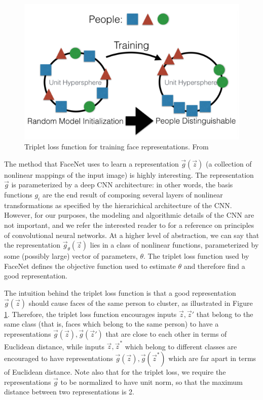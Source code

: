 \begin{figure}
\centering
\includegraphics[scale = 0.5]{Figures/triplet_loss.png}
\caption{Triplet loss function for training face representations.  From \cite{amos2016openface}}
\label{fig:triplet_loss}
\end{figure}

The method that FaceNet uses to learn a representation
$\vec{g}(\vec{z})$ (a collection of nonlinear mappings of the input
image) is highly interesting.  The representation $\vec{g}$ is
parameterized by a deep CNN architecture: in other words, the basis
functions $g_i$ are the end result of composing several layers of
nonlinear transformations as specified by the hierarichical
architecture of the CNN.  However, for our purposes, the modeling and
algorithmic details of the CNN are not important, and we refer the
interested reader to \cite{lecun2013deep} for a reference on principles of
convolutional neural networks.  At a higher level of abstraction, we
can say that the representation $\vec{g}_\theta(\vec{z})$ lies in a
class of nonlinear functions, parameterized by some (possibly large)
vector of parameters, $\theta$.  The triplet loss function used by
FaceNet defines the objective function used to estimate $\theta$ and
therefore find a good representation.

The intuition behind the triplet loss function is that a good
representation $\vec{g}(\vec{z})$ should cause faces of the same
person to cluster, as illustrated in Figure \ref{fig:triplet_loss}.
Therefore, the triplet loss function encourages inputs $\vec{z},
\vec{z}'$ that belong to the same class (that is, faces which belong
to the same person) to have a representations $\vec{g}(\vec{z}),
\vec{g}(\vec{z}')$ that are close to each other in terms of Euclidean
distance, while inputs $\vec{z}, \vec{z}^*$ which belong to different
classes are encouraged to have representations $\vec{g}(\vec{z}),
\vec{g}(\vec{z}^*)$ which are far apart in terms of Euclidean
distance.  Note also that for the triplet loss, we require the
representations $\vec{g}$ to be normalized to have unit norm, so that
the maximum distance between two representations is 2.

